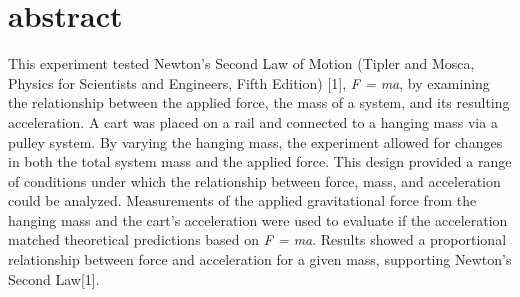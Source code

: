 \section{abstract}\label{sec:abstract}

This experiment tested Newton’s Second Law of Motion (Tipler and Mosca, Physics for Scientists and Engineers, Fifth Edition) [1], \textit{F = ma}, by examining the relationship between the applied force, the mass of a system, and its resulting acceleration. A cart was placed on a rail and connected to a hanging mass via a pulley system. By varying the hanging mass, the experiment allowed for changes in both the total system mass and the applied force. This design provided a range of conditions under which the relationship between force, mass, and acceleration could be analyzed. Measurements of the applied gravitational force from the hanging mass and the cart's acceleration were used to evaluate if the acceleration matched theoretical predictions based on \textit{F = ma}. Results showed a proportional relationship between force and acceleration for a given mass, supporting Newton’s Second Law[1].





